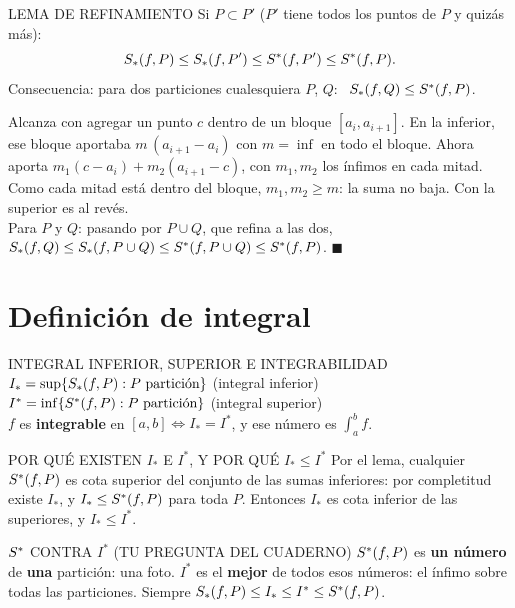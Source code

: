 \agregado
\begin{sello}{LEMA DE REFINAMIENTO}
Si $P\subset P'$ ($P'$ tiene todos los puntos de $P$ y quizás más):
\[S_{*}(f,P)\le S_{*}(f,P')\le S^{*}(f,P')\le S^{*}(f,P).\]
Consecuencia: para dos particiones cualesquiera $P$, $Q$: \ $S_{*}(f,Q)\le S^{*}(f,P)$.
\end{sello}
\begin{demo}
Alcanza con agregar un punto $c$ dentro de un bloque $[a_i,a_{i+1}]$. En la inferior, ese bloque aportaba $m\,(a_{i+1}-a_i)$ con $m=\inf$ en todo el bloque. Ahora aporta $m_1(c-a_i)+m_2(a_{i+1}-c)$, con $m_1,m_2$ los ínfimos en cada mitad. Como cada mitad está dentro del bloque, $m_1,m_2\ge m$: la suma no baja. Con la superior es al revés.\\[2pt]
Para $P$ y $Q$: pasando por $P\cup Q$, que refina a las dos, $S_{*}(f,Q)\le S_{*}(f,P\cup Q)\le S^{*}(f,P\cup Q)\le S^{*}(f,P)$. $\blacksquare$
\end{demo}

\section{Definición de integral}
\apuntes
\begin{sello}{INTEGRAL INFERIOR, SUPERIOR E INTEGRABILIDAD}
$I_*=\sup\{S_{*}(f,P): P\text{ partición}\}$ \quad (integral inferior)\\[2pt]
$I^*=\inf\{S^{*}(f,P): P\text{ partición}\}$ \quad (integral superior)\\[3pt]
$f$ es \textbf{integrable} en $[a,b]\iff I_*=I^*$, y ese número es $\displaystyle\int_a^bf$.
\end{sello}
\agregado
\begin{memo}{POR QUÉ EXISTEN $I_*$ E $I^*$, Y POR QUÉ $I_*\le I^*$}
Por el lema, cualquier $S^{*}(f,P)$ es cota superior del conjunto de las sumas inferiores: por completitud existe $I_*$, y $I_*\le S^{*}(f,P)$ para toda $P$. Entonces $I_*$ es cota inferior de las superiores, y $I_*\le I^*$.
\end{memo}
\begin{tip}{$S^{*}$ CONTRA $I^*$ (TU PREGUNTA DEL CUADERNO)}
$S^{*}(f,P)$ es \textbf{un número} de \textbf{una} partición: una foto. $I^*$ es el \textbf{mejor} de todos esos números: el ínfimo sobre todas las particiones. Siempre $S_{*}(f,P)\le I_*\le I^*\le S^{*}(f,P)$.
\end{tip}

